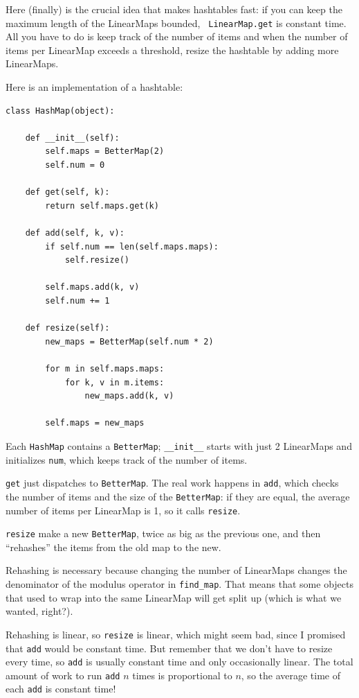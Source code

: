 \documentclass[10pt]{book}
\begin{document}
Here (finally) is the crucial idea that makes hashtables fast: if you
can keep the maximum length of the LinearMaps bounded, {\tt
  LinearMap.get} is constant time.  All you have to do is keep track
of the number of items and when the number of
items per LinearMap exceeds a threshold, resize the hashtable by
adding more LinearMaps.

Here is an implementation of a hashtable:

\begin{verbatim}
class HashMap(object):

    def __init__(self):
        self.maps = BetterMap(2)
        self.num = 0

    def get(self, k):
        return self.maps.get(k)

    def add(self, k, v):
        if self.num == len(self.maps.maps):
            self.resize()

        self.maps.add(k, v)
        self.num += 1

    def resize(self):
        new_maps = BetterMap(self.num * 2)

        for m in self.maps.maps:
            for k, v in m.items:
                new_maps.add(k, v)

        self.maps = new_maps
\end{verbatim}

Each {\tt HashMap} contains a {\tt BetterMap}; \verb"__init__" starts
with just 2 LinearMaps and initializes {\tt num}, which keeps track of
the number of items.

{\tt get} just dispatches to {\tt BetterMap}.  The real work happens
in {\tt add}, which checks the number of items and the size of the
{\tt BetterMap}: if they are equal, the average number of items per
LinearMap is 1, so it calls {\tt resize}.

{\tt resize} make a new {\tt BetterMap}, twice as big as the previous
one, and then ``rehashes'' the items from the old map to the new.

Rehashing is necessary because changing the number of LinearMaps
changes the denominator of the modulus operator in
\verb"find_map".  That means that some objects that used
to wrap into the same LinearMap will get split up (which is
what we wanted, right?).

Rehashing is linear, so
{\tt resize} is linear, which might seem bad, since I promised
that {\tt add} would be constant time.  But remember that
we don't have to resize every time, so {\tt add} is usually
constant time and only occasionally linear.  The total amount
of work to run {\tt add} $n$ times is proportional to $n$,
so the average time of each {\tt add} is constant time!
\end{document}

